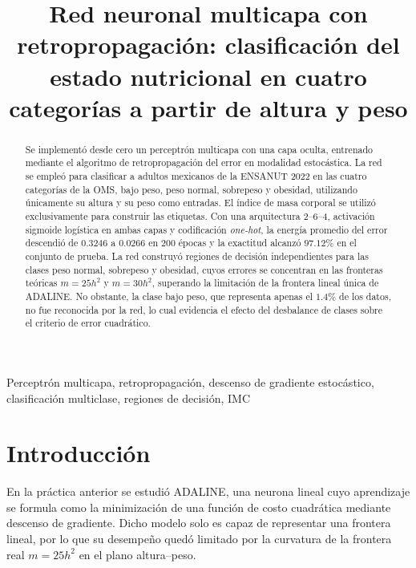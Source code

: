 \documentclass[conference]{IEEEtran}
\begin{document}
\title{Red neuronal multicapa con retropropagación: clasificación del estado nutricional en cuatro categorías a partir de altura y peso}

\author{
}

\maketitle

\begin{abstract}
    Se implementó desde cero un perceptrón multicapa con una capa oculta,
    entrenado mediante el algoritmo de retropropagación del error en modalidad
    estocástica. La red se empleó para clasificar a adultos mexicanos de la
    ENSANUT 2022 en las cuatro categorías de la OMS, bajo peso, peso normal,
    sobrepeso y obesidad, utilizando únicamente su altura y su peso como
    entradas. El índice de masa corporal se utilizó exclusivamente para
    construir las etiquetas. Con una arquitectura 2--6--4, activación sigmoide
    logística en ambas capas y codificación \textit{one-hot}, la energía
    promedio del error descendió de $0.3246$ a $0.0266$ en $200$ épocas y la
    exactitud alcanzó $97.12\%$ en el conjunto de prueba. La red construyó
    regiones de decisión independientes para las clases peso normal,
    sobrepeso y obesidad, cuyos errores se concentran en las fronteras
    teóricas $m=25h^2$ y $m=30h^2$, superando la limitación de la frontera
    lineal única de ADALINE. No obstante, la clase bajo peso, que representa apenas el $1.4\%$
    de los datos, no fue reconocida por la red, lo cual evidencia el efecto
    del desbalance de clases sobre el criterio de error cuadrático.
\end{abstract}

\begin{IEEEkeywords}
Perceptrón multicapa, retropropagación, descenso de gradiente estocástico, clasificación multiclase, regiones de decisión, IMC
\end{IEEEkeywords}

\section{Introducción}
En la práctica anterior se estudió ADALINE, una neurona lineal cuyo
aprendizaje se formula como la minimización de una función de costo
cuadrática mediante descenso de gradiente. Dicho modelo solo es capaz de
representar una frontera lineal, por lo que su desempeño quedó limitado
por la curvatura de la frontera real $m=25h^2$ en el plano altura--peso.
\end{document}

